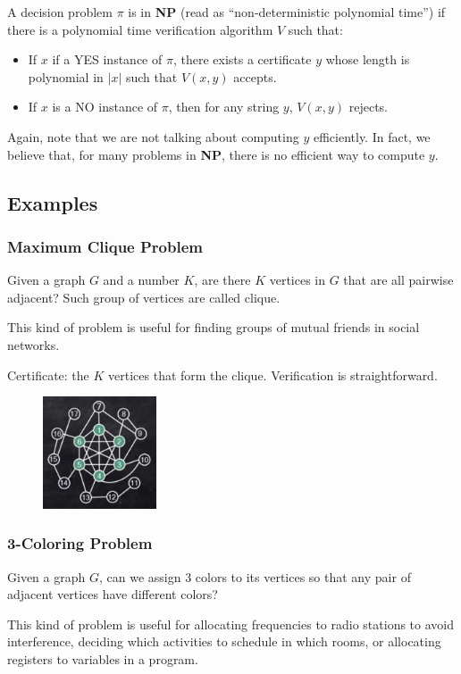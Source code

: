 A decision problem $\pi$ is in \textbf{NP} (read as ``non-deterministic polynomial time'') if there is a polynomial time verification algorithm $V$ such that:
\begin{itemize}
	\item If $x$ if a YES instance of $\pi$, there exists a certificate $y$ whose length is polynomial in $|x|$ such that $V(x, y)$ accepts.
	\item If $x$ is a NO instance of $\pi$, then for any string $y$, $V(x, y)$ rejects.
\end{itemize}

Again, note that we are not talking about computing $y$ efficiently. In fact, we believe that, for many problems in \textbf{NP}, there is no efficient way to compute $y$.
\subsection{Examples}
\subsubsection{Maximum Clique Problem}
Given a graph $G$ and a number $K$, are there $K$ vertices in $G$ that are all pairwise adjacent? Such group of vertices are called clique.

This kind of problem is useful for finding groups of mutual friends in social networks.

Certificate: the $K$ vertices that form the clique. Verification is straightforward.

\begin{figure}[H]
	\centering
	\includegraphics[width=0.3\textwidth]{fig/max-clique-2.png}
\end{figure}

\subsubsection{3-Coloring Problem}
Given a graph $G$, can we assign 3 colors to its vertices so that any pair of adjacent vertices have different colors?

This kind of problem is useful for allocating frequencies to radio stations to avoid interference, deciding which activities to schedule in which rooms, or allocating registers to variables in a program.

